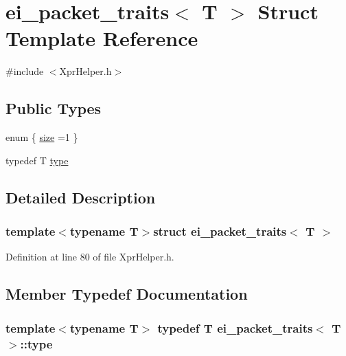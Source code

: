 \hypertarget{structei__packet__traits}{\section{ei\-\_\-packet\-\_\-traits$<$ T $>$ Struct Template Reference}
\label{structei__packet__traits}
}


{\ttfamily \#include $<$Xpr\-Helper.\-h$>$}

\subsection*{Public Types}
\begin{DoxyCompactItemize}
\item 
enum \{ \hyperlink{structei__packet__traits_ae27daa8754b860d6cc58262fcd1709cba56d711a190b04b9dd1fd1517b57190c9}{size} =1
 \}
\item 
typedef T \hyperlink{structei__packet__traits_a72d4faf98dc64633628af4bac9c2f4b0}{type}
\end{DoxyCompactItemize}


\subsection{Detailed Description}
\subsubsection*{template$<$typename T$>$struct ei\-\_\-packet\-\_\-traits$<$ T $>$}



Definition at line 80 of file Xpr\-Helper.\-h.



\subsection{Member Typedef Documentation}
\hypertarget{structei__packet__traits_a72d4faf98dc64633628af4bac9c2f4b0}{
\subsubsection[{type}]{\setlength{\rightskip}{0pt plus 5cm}template$<$typename T$>$ typedef T {\bf ei\-\_\-packet\-\_\-traits}$<$ T $>$\-::{\bf type}}}\label{structei__packet__traits_a72d4faf98dc64633628af4bac9c2f4b0}


